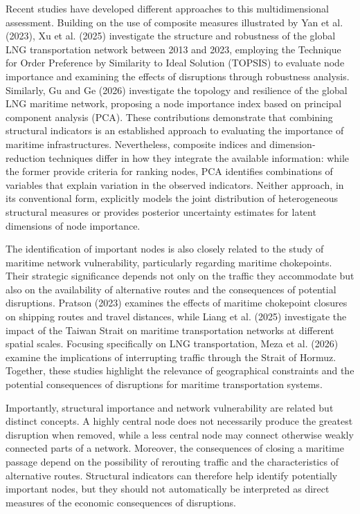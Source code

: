 \documentclass[pdftex,12pt,openright,a4paper,oneside]{book}
\begin{document}
Recent studies have developed different approaches to this multidimensional assessment. Building on the use of composite measures illustrated by Yan et al. (2023), Xu et al. (2025) investigate the structure and robustness of the global LNG transportation network between 2013 and 2023, employing the Technique for Order Preference by Similarity to Ideal Solution (TOPSIS) to evaluate node importance and examining the effects of disruptions through robustness analysis. Similarly, Gu and Ge (2026) investigate the topology and resilience of the global LNG maritime network, proposing a node importance index based on principal component analysis (PCA). These contributions demonstrate that combining structural indicators is an established approach to evaluating the importance of maritime infrastructures. Nevertheless, composite indices and dimension-reduction techniques differ in how they integrate the available information: while the former provide criteria for ranking nodes, PCA identifies combinations of variables that explain variation in the observed indicators. Neither approach, in its conventional form, explicitly models the joint distribution of heterogeneous structural measures or provides posterior uncertainty estimates for latent dimensions of node importance.

The identification of important nodes is also closely related to the study of maritime network vulnerability, particularly regarding maritime chokepoints. Their strategic significance depends not only on the traffic they accommodate but also on the availability of alternative routes and the consequences of potential disruptions. Pratson (2023) examines the effects of maritime chokepoint closures on shipping routes and travel distances, while Liang et al. (2025) investigate the impact of the Taiwan Strait on maritime transportation networks at different spatial scales. Focusing specifically on LNG transportation, Meza et al. (2026) examine the implications of interrupting traffic through the Strait of Hormuz. Together, these studies highlight the relevance of geographical constraints and the potential consequences of disruptions for maritime transportation systems.

Importantly, structural importance and network vulnerability are related but distinct concepts. A highly central node does not necessarily produce the greatest disruption when removed, while a less central node may connect otherwise weakly connected parts of a network. Moreover, the consequences of closing a maritime passage depend on the possibility of rerouting traffic and the characteristics of alternative routes. Structural indicators can therefore help identify potentially important nodes, but they should not automatically be interpreted as direct measures of the economic consequences of disruptions.
\end{document}
